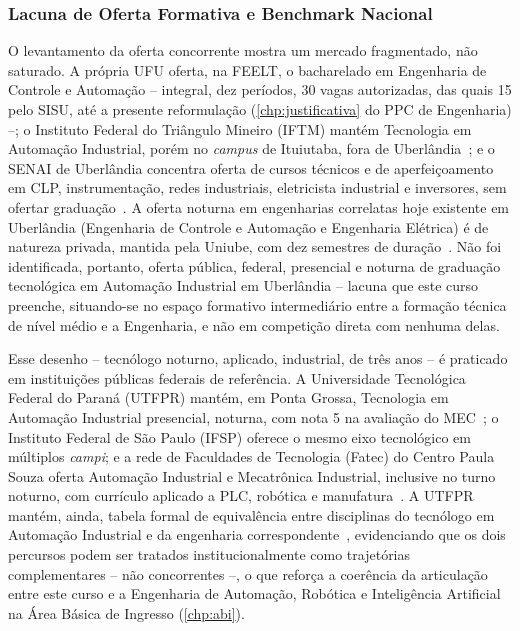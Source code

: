 \subsubsection{Lacuna de Oferta Formativa e Benchmark Nacional}

O levantamento da oferta concorrente mostra um mercado fragmentado, não saturado. A própria UFU oferta, na FEELT, o bacharelado em Engenharia de Controle e Automação -- integral, dez períodos, 30 vagas autorizadas, das quais 15 pelo SISU, até a presente reformulação (\autoref{chp:justificativa} do PPC de Engenharia) --; o Instituto Federal do Triângulo Mineiro (IFTM) mantém Tecnologia em Automação Industrial, porém no \textit{campus} de Ituiutaba, fora de Uberlândia~\cite{iftm_automacao_industrial}; e o SENAI de Uberlândia concentra oferta de cursos técnicos e de aperfeiçoamento em CLP, instrumentação, redes industriais, eletricista industrial e inversores, sem ofertar graduação~\cite{ufu_estudo_viabilidade_cst_2026}. A oferta noturna em engenharias correlatas hoje existente em Uberlândia (Engenharia de Controle e Automação e Engenharia Elétrica) é de natureza privada, mantida pela Uniube, com dez semestres de duração~\cite{ufu_estudo_viabilidade_cst_2026}. Não foi identificada, portanto, oferta pública, federal, presencial e noturna de graduação tecnológica em Automação Industrial em Uberlândia -- lacuna que este curso preenche, situando-se no espaço formativo intermediário entre a formação técnica de nível médio e a Engenharia, e não em competição direta com nenhuma delas.

Esse desenho -- tecnólogo noturno, aplicado, industrial, de três anos -- é praticado em instituições públicas federais de referência. A Universidade Tecnológica Federal do Paraná (UTFPR) mantém, em Ponta Grossa, Tecnologia em Automação Industrial presencial, noturna, com nota 5 na avaliação do MEC~\cite{utfpr_automacao_industrial}; o Instituto Federal de São Paulo (IFSP) oferece o mesmo eixo tecnológico em múltiplos \textit{campi}; e a rede de Faculdades de Tecnologia (Fatec) do Centro Paula Souza oferta Automação Industrial e Mecatrônica Industrial, inclusive no turno noturno, com currículo aplicado a PLC, robótica e manufatura~\cite{ufu_estudo_viabilidade_cst_2026}. A UTFPR mantém, ainda, tabela formal de equivalência entre disciplinas do tecnólogo em Automação Industrial e da engenharia correspondente~\cite{utfpr_equivalencia_automacao_eng}, evidenciando que os dois percursos podem ser tratados institucionalmente como trajetórias complementares -- não concorrentes --, o que reforça a coerência da articulação entre este curso e a Engenharia de Automação, Robótica e Inteligência Artificial na Área Básica de Ingresso (\autoref{chp:abi}).

